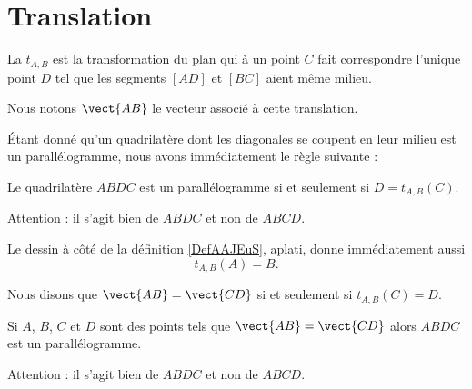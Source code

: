 
\section{Translation}

\begin{multicols}{2}
    \begin{definition}  \label{DefAAJEuS}
    La  \( t_{A,B}\) est la transformation du plan qui à un point \( C\) fait correspondre l'unique point \( D\) tel que les segments \( [AD]\) et \( [BC]\) aient même milieu.
\end{definition}

\columnbreak


\end{multicols}
Nous notons \( \vect{ AB }\) le vecteur associé à cette translation.

Étant donné qu'un quadrilatère dont les diagonales se coupent en leur milieu est un parallélogramme, nous avons immédiatement le règle suivante :
\begin{Aretenir}
    Le quadrilatère \( ABDC\) est un parallélogramme si et seulement si \( D=t_{A,B}(C)\).
\end{Aretenir}
Attention : il s'agit bien de \( ABDC\) et non de \( ABCD\).

Le dessin à côté de la définition \ref{DefAAJEuS}, aplati, donne immédiatement aussi
\begin{equation}
    t_{A,B}(A)=B.
\end{equation}

\begin{definition}
    Nous disons que \( \vect{ AB }=\vect{ CD }\) si et seulement si \( t_{A,B}(C)=D\).
\end{definition}

\begin{propriete}
    Si \( A\), \( B\), \( C\) et \( D\) sont des points tels que \( \vect{ AB }=\vect{ CD }\) alors \( ABDC\) est un parallélogramme.

    Attention : il s'agit bien de \( ABDC\) et non de \( ABCD\).
\end{propriete}

